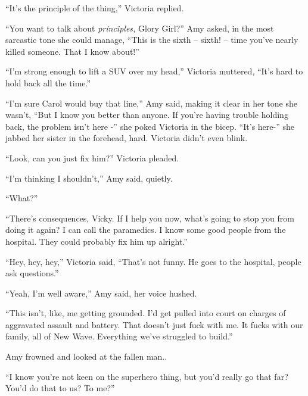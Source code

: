 ``It's the principle of the thing,'' Victoria replied.



``You want to talk about \emph{principles, }Glory Girl?'' Amy asked, in the most sarcastic tone she could manage, ``This is the sixth – sixth! – time you've nearly killed someone.  That I know about!''



``I'm strong enough to lift a SUV over my head,'' Victoria muttered, ``It's hard to hold back all the time.''



``I'm sure Carol would buy that line,'' Amy said, making it clear in her tone she wasn't, ``But I know you better than anyone.  If you're having trouble holding back, the problem isn't here -'' she poked Victoria in the bicep.  ``It's here-'' she jabbed her sister in the forehead, hard.  Victoria didn't even blink.



``Look, can you just fix him?'' Victoria pleaded.



``I'm thinking I shouldn't,'' Amy said, quietly.



``What?''



``There's consequences, Vicky.  If I help you now, what's going to stop you from doing it again?  I can call the paramedics.  I know some good people from the hospital.  They could probably fix him up alright.''



``Hey, hey, hey,'' Victoria said, ``That's not funny.  He goes to the hospital, people ask questions.''



``Yeah, I'm well aware,'' Amy said, her voice hushed.



``This isn't, like, me getting grounded.  I'd get pulled into court on charges of aggravated assault and battery.  That doesn't just fuck with me.  It fucks with our family, all of New Wave.  Everything we've struggled to build.''



Amy frowned and looked at the fallen man..



``I know you're not keen on the superhero thing, but you'd really go that far?  You'd do that to us?  To me?''



